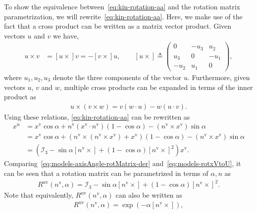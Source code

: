 To show the equivalence between~\eqref{eq:kin-rotation-aa} and the rotation matrix parametrization, we will rewrite~\eqref{eq:kin-rotation-aa}. Here, we make use of the fact that a cross product can be written as a matrix vector product. Given vectors $u$ and $v$ we have, 
\begin{align}
  \label{eq:models-crossproductMatrix}
  u \times v &= [u \times] v = - [v \times] u, 
  \qquad 
  [u \times] \triangleq 
  \begin{pmatrix}
    0 & -u_3 & u_2 \\
    u_3 & 0 & -u_1 \\
    -u_2 & u_1 & 0 
  \end{pmatrix},
\end{align}
where $u_1, u_2, u_3$ denote the three components of the vector $u$. Furthermore, given vectors $u$, $v$ and $w$, multiple cross products can be expanded in terms of the inner product as
\begin{align}
  \label{eq:models-crossproductExp}
  u \times (v \times w)
    = v (w \cdot u) - w (u \cdot v).
\end{align}
Using these relations, \eqref{eq:kin-rotation-aa} can be rewritten as
\begin{align}
  x^\text{u} &= x^\text{v} \cos\alpha 
    + n^\text{v} (x^\text{v} \cdot n^\text{v})(1-\cos\alpha)
    - (n^\text{v} \times x^\text{v})\sin\alpha \nonumber\\
    &= x^\text{v} \cos\alpha 
     + (n^\text{v} \times (n^\text{v} \times x^\text{v}) 
       + x^\text{v})(1-\cos\alpha)
     - (n^\text{v} \times x^\text{v})\sin\alpha \nonumber \\
  \label{eq:models-axisAngle-rotMatrix-der}
  &= \left( \mathcal{I}_3 - \sin\alpha [n^\text{v} \times] 
        + (1-\cos\alpha)[n^\text{v} \times]^2
      \right) x^\text{v}.
\end{align}
Comparing~\eqref{eq:models-axisAngle-rotMatrix-der} and~\eqref{eq:models-rotxVtoU}, it can be seen that a rotation matrix can be parametrized in terms of $\alpha, n$ as
\begin{align}
\label{eq:models-axisAngle-rotMatrix}
R^\text{uv}(n^\text{v},\alpha) = \mathcal{I}_3 - \sin\alpha [n^\text{v} \times] 
        + (1-\cos\alpha)[n^\text{v} \times]^2.
\end{align}
Note that equivalently, $R^\text{uv}(n^\text{v},\alpha)$ can also be written as
\begin{align}
\label{eq:models-rotMatrixAxisAngleExp}
R^\text{uv}(n^\text{v},\alpha) = \exp \left( - \alpha [n^\text{v} \times] \right), 
\end{align}

